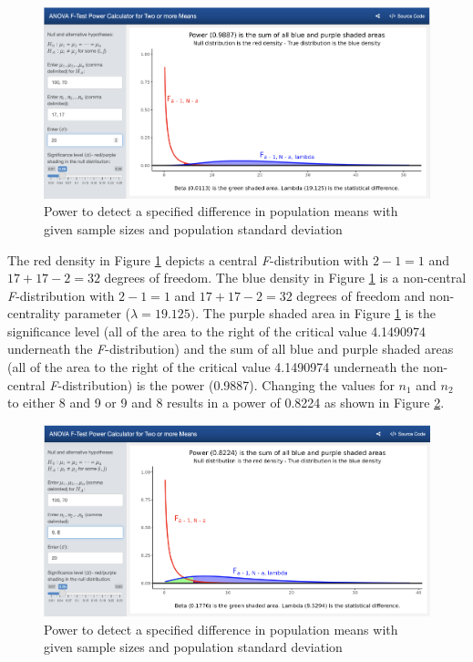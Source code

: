 \documentclass[
]{article}
\begin{document}
\begin{figure}

{\centering \includegraphics[width=7.36in]{./pics/fig-power1b} 

}

\caption{Power to detect a specified difference in population means with given sample sizes and population standard deviation}\label{fig:power1}
\end{figure}

The red density in Figure \ref{fig:power1} depicts a central \emph{F}-distribution with \(2 - 1 = 1\) and \(17 + 17 - 2 = 32\) degrees of freedom. The blue density in Figure \ref{fig:power1} is a non-central \emph{F}-distribution with \(2-1 = 1\) and \(17 + 17 - 2 = 32\) degrees of freedom and non-centrality parameter (\(\lambda = 19.125)\). The purple shaded area in Figure \ref{fig:power1} is the significance level (all of the area to the right of the critical value 4.1490974 underneath the \emph{F}-distribution) and the sum of all blue and purple shaded areas (all of the area to the right of the critical value 4.1490974 underneath the non-central \emph{F}-distribution) is the power (0.9887). Changing the values for \(n_1\) and \(n_2\) to either 8 and 9 or 9 and 8 results in a power of 0.8224 as shown in Figure \ref{fig:power2}.

\begin{figure}

{\centering \includegraphics[width=7.34in]{./pics/fig-power2b} 

}

\caption{Power to detect a specified difference in population means with given sample sizes and population standard deviation}\label{fig:power2}
\end{figure}
\end{document}
